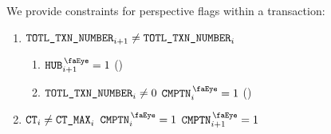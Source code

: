 We provide constraints for perspective flags within a transaction:
\begin{enumerate}
	\item \If $\texttt{TOTL}\texttt{\_}\texttt{TXN\_NUMBER} _{i + 1} \neq \texttt{TOTL}\texttt{\_}\texttt{TXN\_NUMBER} _{i}$ \Then
		\begin{enumerate}
		        \item $\isUserTxnHubView _{i + 1} = 1$ (\sanityCheck)
		        \item \If $\texttt{TOTL}\texttt{\_}\texttt{TXN\_NUMBER} _{i} \neq 0$ \Then $\isUserTxnComputation _{i} = 1$ (\sanityCheck)
		\end{enumerate}
	\item \If $\texttt{CT} _{i} \neq \texttt{CT\_MAX} _{i}$ \et $\isUserTxnComputation _{i} = 1$ \Then  $\isUserTxnComputation _{i + 1} = 1$
\end{enumerate}
